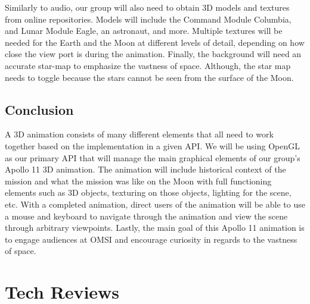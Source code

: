 \documentclass[onecolumn, draftclsnofoot,10pt, compsoc]{IEEEtran}
\begin{document}
    Similarly to audio, our group will also need to obtain 3D models and textures from online repositories. Models will include the Command Module Columbia, and Lunar Module Eagle, an astronaut, and more. Multiple textures will be needed for the Earth and the Moon at different levels of detail, depending on how close the view port is during the animation. Finally, the background will need an accurate star-map to emphasize the vastness of space. Although, the star map needs to toggle because the stars cannot be seen from the surface of the Moon. 
    
\subsection{Conclusion}
A 3D animation consists of many different elements that all need to work together based on the implementation in a given API. We will be using OpenGL as our primary API that will manage the main graphical elements of our group's Apollo 11 3D animation. The animation will include historical context of the mission and what the mission was like on the Moon with full functioning elements such as 3D objects, texturing on those objects, lighting for the scene, etc. With a completed animation, direct users of the animation will be able to use a mouse and keyboard to navigate through the animation and view the scene through arbitrary viewpoints. Lastly, the main goal of this Apollo 11 animation is to engage audiences at OMSI and encourage curiosity in regards to the vastness of space. 

\section{Tech Reviews}
\end{document}
